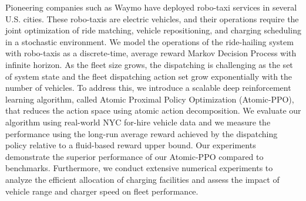 Pioneering companies such as Waymo have deployed robo-taxi services in several U.S. cities. These robo-taxis are electric vehicles, and their operations require the joint optimization of ride matching, vehicle repositioning, and charging scheduling in a stochastic environment. We model the operations of the ride-hailing system with robo-taxis as a discrete-time, average reward Markov Decision Process with infinite horizon. As the fleet size grows, the dispatching is challenging as the set of system state and the fleet dispatching action set grow exponentially with the number of vehicles. To address this, we introduce a scalable deep reinforcement learning algorithm, called Atomic Proximal Policy Optimization (Atomic-PPO), that reduces the action space using atomic action decomposition. We evaluate our algorithm using real-world NYC for-hire vehicle data and we measure the performance using the long-run average reward achieved by the dispatching policy relative to a fluid-based reward upper bound. Our experiments demonstrate the superior performance of our Atomic-PPO compared to benchmarks. Furthermore, we conduct extensive numerical experiments to analyze the efficient allocation of charging facilities and assess the impact of vehicle range and charger speed on fleet performance.
